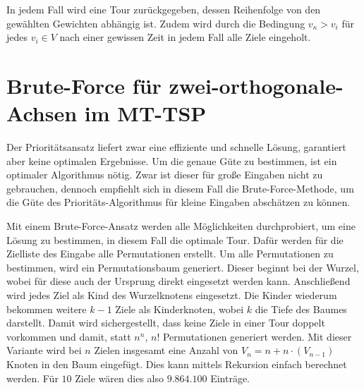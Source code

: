 \documentclass[german,version-2019-11]{uzl-thesis}
\begin{document}
In jedem Fall wird eine Tour zurückgegeben, dessen Reihenfolge von den gewählten Gewichten abhängig ist. Zudem wird durch die Bedingung $v_\kappa>v_i$ für jedes $v_i\in V$ nach einer gewissen Zeit in jedem Fall alle Ziele eingeholt.

\section{Brute-Force für zwei-orthogonale-Achsen im MT-TSP}

Der Prioritätsansatz liefert zwar eine effiziente und schnelle Lösung, garantiert aber keine optimalen Ergebnisse. Um die genaue Güte zu bestimmen, ist ein optimaler Algorithmus nötig. Zwar ist dieser für große Eingaben nicht zu gebrauchen, dennoch empfiehlt sich in diesem Fall die Brute-Force-Methode, um die Güte des Prioritäts-Algorithmus für kleine Eingaben abschätzen zu können. 

Mit einem Brute-Force-Ansatz werden alle Möglichkeiten durchprobiert, um eine Lösung zu bestimmen, in diesem Fall die optimale Tour. Dafür werden für die Zielliste des Eingabe alle Permutationen erstellt. Um alle Permutationen zu bestimmen, wird ein Permutationsbaum generiert. Dieser beginnt bei der Wurzel, wobei für diese auch der Ursprung direkt eingesetzt werden kann. Anschließend wird jedes Ziel als Kind des Wurzelknotens eingesetzt. Die Kinder wiederum bekommen weitere $k-1$ Ziele als Kinderknoten, wobei $k$ die Tiefe des Baumes darstellt. Damit wird sichergestellt, dass keine Ziele in einer Tour doppelt vorkommen und damit, statt $n^n$, $n!$ Permutationen generiert werden. Mit dieser Variante wird bei $n$ Zielen insgesamt eine Anzahl von $V_n = n + n\cdot (V_{n-1})$ Knoten in den Baum eingefügt. Dies kann mittels Rekursion einfach berechnet werden. Für $10$ Ziele wären dies also $9.864.100$ Einträge.
\end{document}
